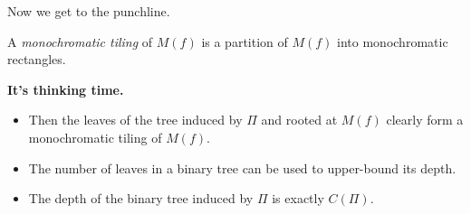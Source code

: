 Now we get to the punchline.
\pause
\begin{definition}
A \emph{monochromatic tiling} of $M(f)$ is a partition of $M(f)$ into
monochromatic rectangles.
\end{definition}
\pause
\begin{center}
\textbf{It's thinking time.}
\end{center}
\pause
\begin{itemize}
\item Then the leaves of the tree induced by $\Pi$ and rooted at $M(f)$ clearly form a monochromatic tiling of $M(f)$.
\pause
\item The number of leaves in a binary tree can be used to upper-bound its depth.
\pause
\item The depth of the binary tree induced by $\Pi$ is exactly $C(\Pi)$.
\end{itemize}